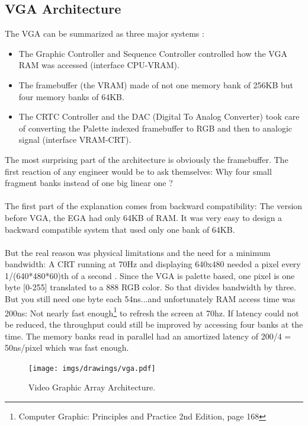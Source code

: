 \documentclass[book.tex]{subfiles}
\begin{document}
\subsection{VGA Architecture}

The VGA can be summarized as three major systems :

\begin{itemize}
\item The Graphic Controller and Sequence Controller controlled how the VGA RAM was accessed (interface CPU-VRAM).
\item The framebuffer (the VRAM) made of not one memory bank of 256KB but four memory banks of 64KB.
\item The CRTC Controller and the DAC (Digital To Analog Converter) took care of converting the Palette indexed framebuffer to RGB and then to analogic signal (interface VRAM-CRT).
\end{itemize}

The most surprising part of the architecture is obviously the framebuffer. The first reaction of any engineer would be to ask themselves: Why four small fragment banks instead of one big linear one ?\\
\\
The first part of the explanation comes from backward compatibility: The version before VGA, the EGA had only 64KB of RAM. It was very easy to design a backward compatible system that used only one bank of 64KB.\\
\\
But the real reason was physical limitations and the need for a minimum bandwidth: A CRT running at 70Hz and displaying 640x480 needed a pixel every 1/(640*480*60)th of a second . Since the VGA is palette based, one pixel is one byte [0-255] translated to a 888 RGB color. So that divides bandwidth by three. But you still need one byte each 54ns...and unfortunately RAM access time was 200ns: Not nearly fast enough\footnote{Computer Graphic: Principles and Practice 2nd Edition, page 168} to refresh the screen at 70hz. If latency could not be reduced, the throughput could still be improved by accessing four banks at the time. The memory banks read in parallel had an amortized latency of 200/4 = 50ns/pixel which was fast enough.


\begin{figure}[H]
\centering
\texttt{[image: imgs/drawings/vga.pdf]}
\caption{Video Graphic Array Architecture.}
\label{fig:vga_arch}
\end{figure}
\end{document}
